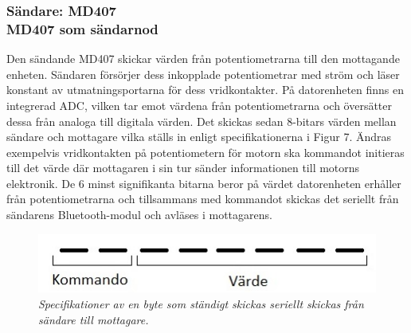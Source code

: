 \documentclass[a4paper]{article}
\begin{document}
\subsubsection{Sändare: MD407 \\ MD407 som sändarnod}
Den sändande MD407 skickar värden från potentiometrarna till den mottagande enheten. Sändaren försörjer dess inkopplade potentiometrar med ström och läser konstant av utmatningsportarna för dess vridkontakter. På datorenheten finns en integrerad ADC, vilken tar emot värdena från potentiometrarna och översätter dessa från analoga till digitala värden. Det skickas sedan 8-bitars värden mellan sändare och mottagare vilka ställs in enligt specifikationerna i Figur 7. Ändras exempelvis vridkontakten på potentiometern för motorn ska kommandot initieras till det värde där mottagaren i sin tur sänder informationen till motorns elektronik. De 6 minst signifikanta bitarna beror på värdet datorenheten erhåller från potentiometrarna och tillsammans med kommandot skickas det seriellt från sändarens Bluetooth-modul och avläses i mottagarens.


\begin{figure}[H]
\includegraphics[scale=1]{aByteComVal.jpg}
\centering
\caption{\it Specifikationer av en byte som ständigt skickas seriellt skickas från sändare till mottagare.}
\end{figure} 





\end{document}
